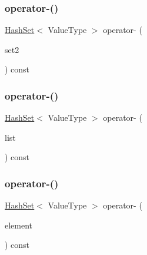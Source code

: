 \subsubsection{\texorpdfstring{operator-\/()}{operator-()}\hspace{0.1cm}{\footnotesize\ttfamily [1/3]}}
{\footnotesize\ttfamily \mbox{\hyperlink{classHashSet}{Hash\+Set}}$<$ Value\+Type $>$ operator-\/ (\begin{DoxyParamCaption}\item[{const \mbox{\hyperlink{classHashSet}{Hash\+Set}}$<$ Value\+Type $>$ \&}]{set2 }\end{DoxyParamCaption}) const}

\mbox{\label{classHashSet_a974523da7e472820f69fa92de07ca873}} 
\subsubsection{\texorpdfstring{operator-\/()}{operator-()}\hspace{0.1cm}{\footnotesize\ttfamily [2/3]}}
{\footnotesize\ttfamily \mbox{\hyperlink{classHashSet}{Hash\+Set}}$<$ Value\+Type $>$ operator-\/ (\begin{DoxyParamCaption}\item[{std\+::initializer\+\_\+list$<$ Value\+Type $>$}]{list }\end{DoxyParamCaption}) const}

\mbox{\label{classHashSet_ac660f492d9235ece4859f7fb0ab1b13b}} 
\subsubsection{\texorpdfstring{operator-\/()}{operator-()}\hspace{0.1cm}{\footnotesize\ttfamily [3/3]}}
{\footnotesize\ttfamily \mbox{\hyperlink{classHashSet}{Hash\+Set}}$<$ Value\+Type $>$ operator-\/ (\begin{DoxyParamCaption}\item[{const Value\+Type \&}]{element }\end{DoxyParamCaption}) const}

\mbox{\label{classHashSet_ad5746f40baf354cdd544686617ae0bfc}} 
